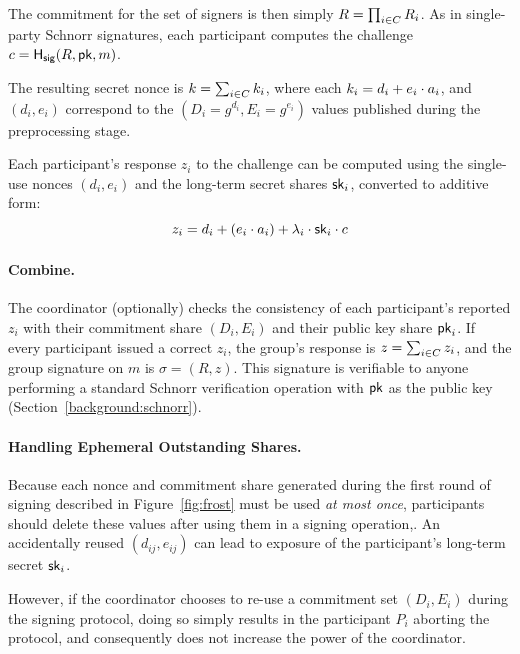 The commitment for the set of signers
is then simply $R = \prod_{i \in C} R_i$.
As in single-party Schnorr signatures, each participant computes the challenge
$c = \mathsf{H_{sig}}(R, \mathsf{pk}, m)$.

The resulting secret nonce is
$k = \sum_{i \in C} k_i$, where each $k_i = d_i + e_i \cdot a_i$,
and $(d_i, e_i)$ correspond to the $(D_i = g^{d_i},
E_i=g^{e_i})$ values published during the preprocessing stage.

Each participant's response $z_i$ to the challenge
can be computed using the single-use nonces $(d_i, e_i)$ and the
long-term secret shares $\mathsf{sk}_i$, converted to additive form:
\[
  z_i = d_i + (e_i \cdot a_i) + \lambda_i \cdot \mathsf{sk}_i \cdot c
\]

\paragraph{Combine.}
The coordinator (optionally) checks the consistency of each participant's reported
$z_i$ with their commitment share $(D_i, E_i)$ and their public key share
$\mathsf{pk}_i$.
If every participant issued a correct $z_i$,
the group's response is $z = \sum_{i \in C} z_i$,
and the group signature on $m$ is $\sigma=(R, z)$.
This signature is verifiable to anyone performing a standard Schnorr verification operation
with $\mathsf{pk}$ as the public key (Section~\ref{background:schnorr}).



\paragraph{Handling Ephemeral Outstanding Shares.} Because each nonce and
commitment share generated during the first round of signing described in Figure~\ref{fig:frost}
must be used \emph{at most once},
participants should delete these values after using them in a signing operation,.
An accidentally reused $(d_{ij}, e_{ij})$ can lead to exposure of the participant's
long-term secret $\mathsf{sk}_i$.

However, if the coordinator chooses to re-use a commitment set $(D_i,
E_i)$ during the signing protocol,  doing so simply results in
the participant $P_i$ aborting the protocol, and consequently does not increase the power of the coordinator.

